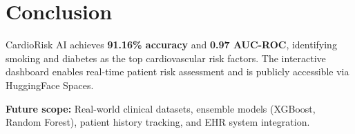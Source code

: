 \documentclass[12pt, a4paper]{article}
\begin{document}
\section{Conclusion}
CardioRisk AI achieves \textbf{91.16\% accuracy} and \textbf{0.97 AUC-ROC}, identifying smoking and diabetes as the top cardiovascular risk factors. The interactive dashboard enables real-time patient risk assessment and is publicly accessible via HuggingFace Spaces.

\textbf{Future scope:} Real-world clinical datasets, ensemble models (XGBoost, Random Forest), patient history tracking, and EHR system integration.
\end{document}
